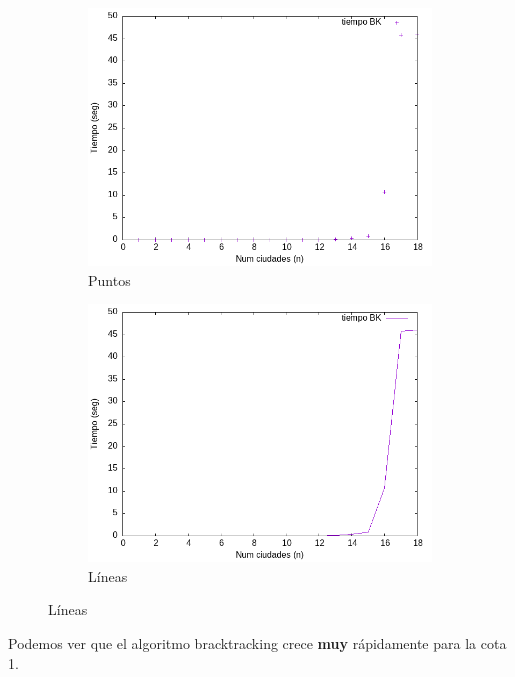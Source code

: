 \documentclass{article}
\begin{document}
\begin{figure}[H]
    \centering
    \begin{subfigure}[b]{0.45\textwidth}
        \centering
        \includegraphics[width=\textwidth]{imagenes/cota1/ef_bk/TSP_BK_empirica_points.png}
        \caption{Puntos}
    \end{subfigure}
    \begin{subfigure}[b]{0.45\textwidth}
        \centering
        \includegraphics[width=\textwidth]{imagenes/cota1/ef_bk/TSP_BK_empirica_lines.png}
        \caption{Líneas}
    \end{subfigure}
\end{figure}

Podemos ver que el algoritmo bracktracking crece \textbf{muy} rápidamente 
para la cota 1.
\end{document}
